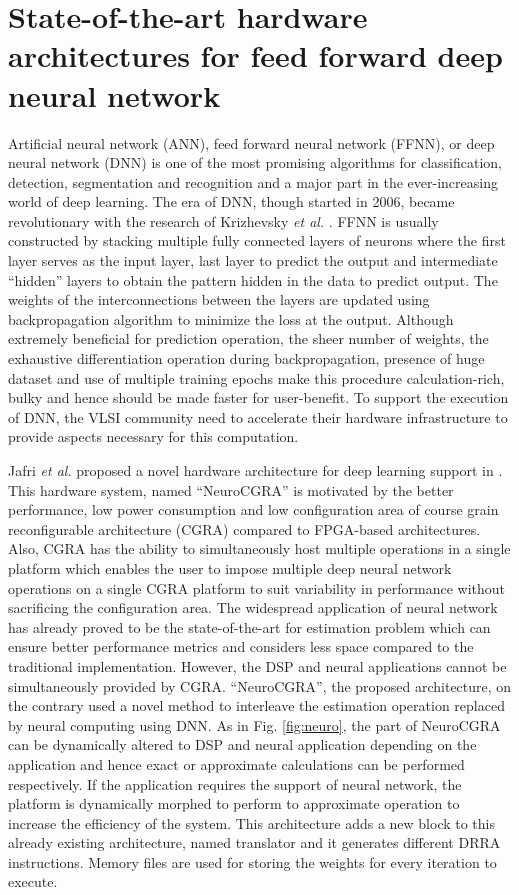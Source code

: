 \documentclass[journal]{IEEEtran}
\begin{document}
\section{State-of-the-art hardware architectures for feed forward deep neural network}
Artificial neural network (ANN), feed forward neural network (FFNN), or deep neural network (DNN) is one of the most promising algorithms for classification, detection, segmentation and recognition and a major part in the ever-increasing world of deep learning. The era of DNN, though started in 2006, became revolutionary with the research of Krizhevsky \textit{et al.} \cite{paper6}. FFNN is usually constructed by stacking multiple fully connected layers of neurons where the first layer serves as the input layer, last layer to predict the output and intermediate ``hidden'' layers to obtain the pattern hidden in the data to predict output. The weights of the interconnections between the layers are updated using backpropagation algorithm to minimize the loss at the output. Although extremely beneficial for prediction operation, the sheer number of weights, the exhaustive differentiation operation during backpropagation, presence of huge dataset and use of multiple training epochs make this procedure calculation-rich, bulky and hence should be made faster for user-benefit. To support the execution of DNN, the VLSI community need to accelerate their hardware infrastructure to provide aspects necessary for this computation.

\par Jafri \textit{et al.} proposed a novel hardware architecture for deep learning support in \cite{paper7}. This hardware system, named ``NeuroCGRA'' is motivated by the better performance, low power consumption and low configuration area of course grain reconfigurable architecture (CGRA) compared to FPGA-based architectures. Also, CGRA has the ability to simultaneously host multiple operations in a single platform which enables the user to impose multiple deep neural network operations on a single CGRA platform to suit variability in performance without sacrificing the configuration area. The widespread application of neural network has already proved to be the state-of-the-art for estimation problem which can ensure better performance metrics and considers less space compared to the traditional implementation. However, the DSP and neural applications cannot be simultaneously provided by CGRA. ``NeuroCGRA'', the proposed architecture, on the contrary used a novel method to interleave the estimation operation replaced by neural computing using DNN. As in Fig. \ref{fig:neuro}, the part of NeuroCGRA can be dynamically altered to DSP and neural application depending on the application and hence exact or approximate calculations can be performed respectively. If the application requires the support of neural network, the platform is dynamically morphed to perform to approximate operation to increase the efficiency of the system. This architecture adds a new block to this already existing architecture, named translator and it generates different DRRA instructions. Memory files are used for storing the weights for every iteration to execute.
\end{document}

